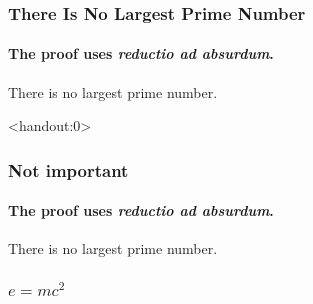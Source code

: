 \usepackage{amsthm}




\begin{frame}
    \titlepage
  \end{frame}
    
\begin{frame}
    \frametitle{There Is No Largest Prime Number} 
    \framesubtitle{The proof uses \textit{reductio ad absurdum}.}

    \begin{theorem}
        There is no largest prime number.
    \end{theorem}
\end{frame}

\begin{frame}<handout:0>
    \frametitle{Not important} 
    \framesubtitle{The proof uses \textit{reductio ad absurdum}.}

    \begin{theorem}
        There is no largest prime number.
    \end{theorem}
\end{frame}

\begin{frame}
    \frametitle{\(e = mc^2\)}
\end{frame}



